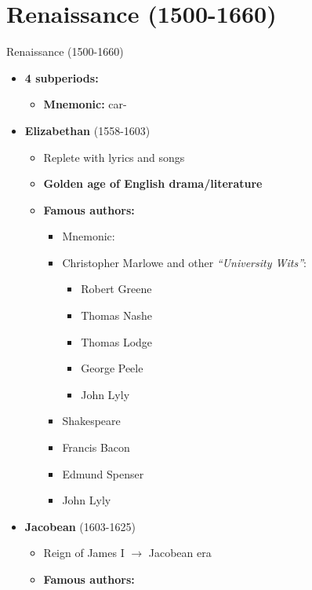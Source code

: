 \documentclass[
  12pt,
  ignorenonframetext,
  progressbar=frametitle]{beamer}
\providecommand{\tightlist}{%
  \setlength{\itemsep}{0pt}\setlength{\parskip}{0pt}}
\begin{document}
\section{Renaissance (1500-1660)}
\begin{frame}[allowframebreaks]
{Renaissance (1500-1660)}
\begin{itemize}
\tightlist
\item
  \textbf{4 subperiods:}

  \begin{itemize}
  \tightlist
  \item
    \textbf{Mnemonic:}  car-
  \end{itemize}
\item
  \textbf{Elizabethan} (1558-1603)

  \begin{itemize}
  \tightlist
  \item
    Replete with lyrics and songs
  \item
    \textbf{Golden age of English drama/literature}
  \item
    \textbf{Famous authors:}

    \begin{itemize}
    \tightlist
    \item
      Mnemonic: 
    \item
      Christopher Marlowe and other \emph{``University Wits''}:

      \begin{itemize}
      \tightlist
      \item
        Robert Greene
      \item
        Thomas Nashe
      \item
        Thomas Lodge
      \item
        George Peele
      \item
        John Lyly
      \end{itemize}
    \item
      Shakespeare
    \item
      Francis Bacon
    \item
      Edmund Spenser
    \item
      John Lyly
    \end{itemize}
  \end{itemize}
\item
  \textbf{Jacobean} (1603-1625)

  \begin{itemize}
  \tightlist
  \item
    Reign of James I \(\rightarrow\) Jacobean era
  \item
    \textbf{Famous authors:}


\end{itemize}
\end{itemize}
\end{frame}
\end{document}
